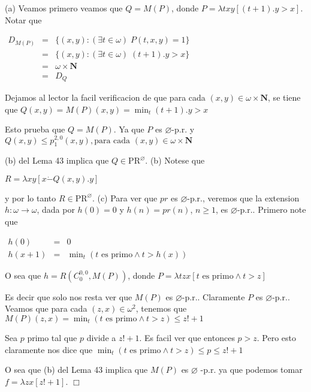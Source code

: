 \PROOF (a) Veamos primero veamos que \(Q=M(P)\), donde \(P=\lambda txy\left[ (t+1).y >x \right] \). Notar que

\(\displaystyle \begin{array}{rcl} D_{M(P)} & =& \{(x,y):(\exists t\in \omega )\;P(t,x,y)=1\} \\ & =& \{(x,y):(\exists t\in \omega )\;(t+1).y >x\} \\ & =& \omega \times \mathbf{N} \\ & =& D_{Q} \end{array} \)

Dejamos al lector la facil verificacion de que para cada \((x,y)\in \omega \times \mathbf{N}\), se tiene que
\(\displaystyle Q(x,y)=M(P)(x,y)=\min_{t}(t+1).y >x \)

Esto prueba que \(Q=M(P)\). Ya que \(P\) es \(\varnothing \)-p.r. y
\(\displaystyle Q(x,y)\leq p_{1}^{2,0}(x,y),\text{para cada }(x,y)\in \omega \times \mathbf{N } \)

(b) del Lema 43 implica que \(Q\in \mathrm{PR}^{\varnothing }\).
(b) Notese que

\(\displaystyle R=\lambda xy\left[ x\dot{-}Q(x,y).y\right] \)

y por lo tanto \(R\in \mathrm{PR}^{\varnothing }\).
(c) Para ver que \(pr\) es \(\varnothing \)-p.r., veremos que la extension \( h:\omega \rightarrow \omega \), dada por \(h(0)=0\) y \(h(n)=pr(n)\), \(n\geq 1\), es \(\varnothing \)-p.r.. Primero note que

\(\displaystyle \begin{array}{rcl} h(0) & =& 0 \\ h(x+1) & =& \min\nolimits_{t}\left( t\text{ es primo}\wedge t >h(x)\right) \end{array} \)

O sea que \(h=R\left( C_{0}^{0,0},M(P)\right) \), donde
\(\displaystyle P=\lambda tzx\left[ t\text{ es primo}\wedge t >z\right] \)

Es decir que solo nos resta ver que \(M(P)\) es \(\varnothing \)-p.r.. Claramente \( P\) es \(\varnothing \)-p.r.. Veamos que para cada \((z,x)\in \omega ^{2}\), tenemos que
\(\displaystyle M(P)(z,x)=\min\nolimits_{t}\left( t\text{ es primo}\wedge t >z\right) \leq z!+1 \)

Sea \(p\) primo tal que \(p\) divide a \(z!+1\). Es facil ver que entonces \(p >z\). Pero esto claramente nos dice que
\(\displaystyle \min\nolimits_{t}\left( t\text{ es primo}\wedge t >z\right) \leq p\leq z!+1 \)

O sea que (b) del Lema 43 implica que \(M(P)\) es \(\varnothing \) -p.r. ya que podemos tomar \(f=\lambda zx\left[ z!+1\right] \). \(\Box\)


